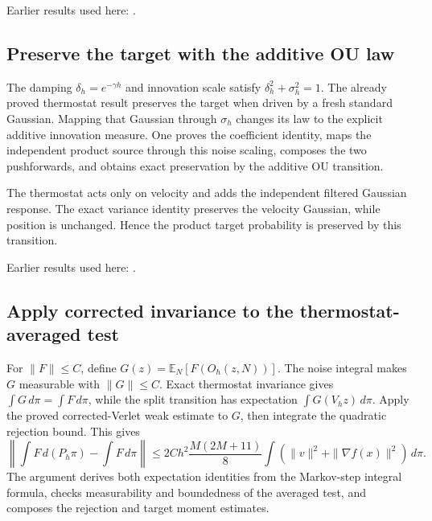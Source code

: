\documentclass[11pt,a4paper]{report}
\begin{document}
Earlier results used here: \cite[Section~3.26.9]{LangevinLean2026ULASC}.
\subsection{\texorpdfstring{Preserve the target with the additive OU law}{Preserve the target with the additive OU law}}
\label{report-step-KineticLangevin-SplittingTarget-lean-4}


The damping \(\delta_h=e^{-\gamma h}\) and innovation scale satisfy \(\delta_h^2+\sigma_h^2=1\). The already proved thermostat result preserves the target when driven by a fresh standard Gaussian. Mapping that Gaussian through \(\sigma_h\) changes its law to the explicit additive innovation measure. One proves the coefficient identity, maps the independent product source through this noise scaling, composes the two pushforwards, and obtains exact preservation by the additive OU transition.



The thermostat acts only on velocity and adds the independent filtered Gaussian response. The exact variance identity preserves the velocity Gaussian, while position is unchanged. Hence the product target probability is preserved by this transition.



Earlier results used here: \cite[Section~3.33.5]{LangevinLean2026ULASC}.
\subsection{\texorpdfstring{Apply corrected invariance to the thermostat-averaged test}{Apply corrected invariance to the thermostat-averaged test}}
\label{report-step-KineticLangevin-SplittingTarget-lean-5}


For \(\|F\|\le C\), define \(G(z)=\mathbb E_N[F(O_h(z,N))]\). The noise integral makes \(G\) measurable with \(\|G\|\le C\). Exact thermostat invariance gives \(\int G\,d\pi=\int F\,d\pi\), while the split transition has expectation \(\int G(V_hz)\,d\pi\). Apply the proved corrected-Verlet weak estimate to \(G\), then integrate the quadratic rejection bound. This gives \[\left\|\int F\,d(P_h\pi)-\int F\,d\pi\right\|\le2Ch^2\frac{M(2M+11)}8\int(\|v\|^2+\|\nabla f(x)\|^2)\,d\pi.\] The argument derives both expectation identities from the Markov-step integral formula, checks measurability and boundedness of the averaged test, and composes the rejection and target moment estimates.
\end{document}
